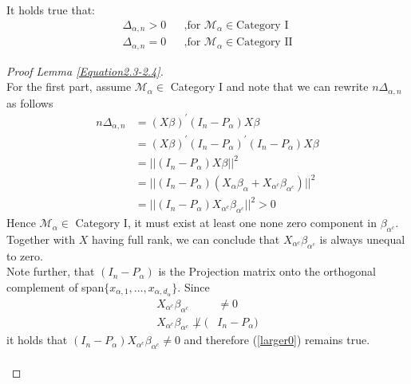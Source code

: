 \documentclass[Research_Module_ES.tex]{subfiles}
\begin{document}
\begin{lemma}
	\label{Equation2.3-2.4}
	It holds true that:
	\begin{align*}
		&&\Delta_{\alpha,n}>0 && \text{,for } \mathcal{M}_\alpha\in\text{Category I}&&\\
		&&\Delta_{\alpha,n}=0 && \text{,for } \mathcal{M}_\alpha\in\text{Category II}&&
	\end{align*}
\end{lemma}
\begin{proof}[Proof Lemma \ref{Equation2.3-2.4}]~\\
	For the first part, assume $\mathcal{M}_\alpha\in$ Category I and note that we can rewrite $n\Delta_{\alpha,n}$ as follows
	\begin{align}\nonumber
		n\Delta_{\alpha,n}&= \left(X \beta \right)^\prime \left(I_n-P_\alpha\right)X\beta\\\nonumber
		&= \left(X \beta \right)^\prime \left(I_n-P_\alpha\right)^\prime\left(I_n-P_\alpha\right)X\beta\\\nonumber
		&=||\left(I_n-P_\alpha\right)X\beta||^2\\\nonumber
		&=||\left(I_n-P_\alpha\right)(X_\alpha\beta_\alpha+X_{\alpha^c}\beta_{\alpha^c})||^2\\
		&=||\left(I_n-P_\alpha\right)X_{\alpha^c}\beta_{\alpha^c}||^2>0 \label{larger0}
	\end{align}
	Hence 
	$\mathcal{M}_\alpha\in$ Category I, it must exist at least one none zero component in $\beta_{\alpha^c}$. Together with $X$ having full rank, we can conclude that $X_{\alpha^c}\beta_{\alpha^c}$ is always unequal to zero.\\ 
	Note further, that $(I_n-P_\alpha)$ is the Projection matrix onto the orthogonal complement of span$\{x_{\alpha,1},\ldots,x_{\alpha,d_\alpha}\}$. Since
	\begin{align*}
		X_{\alpha^c}\beta_{\alpha^c}&\neq 0\\
		X_{\alpha^c}\beta_{\alpha^c}\not\perp (&I_n-P_\alpha)
	\end{align*}
	it holds that $(I_n-P_\alpha) X_{\alpha^c}\beta_{\alpha^c}\neq 0$ and therefore (\ref{larger0}) remains true.\\
	\\

\end{proof}
\end{document}

